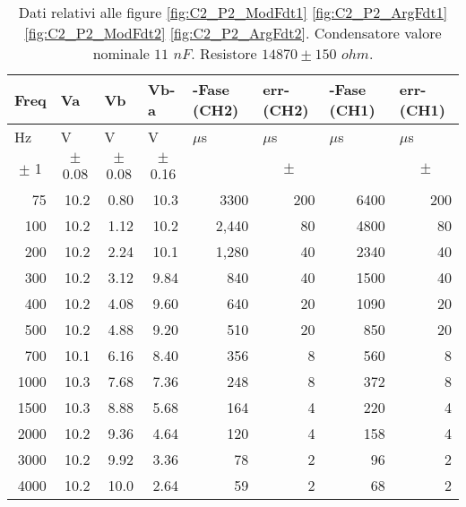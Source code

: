 \begin{table}[H]
\begin{center}
\begin{tabular}{|r|r|r|r|r|r|r|r|}
\hline
\multicolumn{1}{|l|}{Freq} & \multicolumn{1}{l|}{Va} & \multicolumn{1}{l|}{Vb} & \multicolumn{1}{l|}{Vb-a} & \multicolumn{1}{l|}{-Fase (CH2)} & \multicolumn{1}{l|}{err-(CH2)} & \multicolumn{1}{l|}{-Fase (CH1)} & \multicolumn{1}{l|}{err-(CH1)} \\ \hline
\multicolumn{1}{|l|}{Hz} & \multicolumn{1}{l|}{V} & \multicolumn{1}{l|}{V} & \multicolumn{1}{l|}{V} & \multicolumn{1}{l|}{$\mu$s} & \multicolumn{1}{l|}{$\mu$s} & \multicolumn{1}{l|}{$\mu$s} & \multicolumn{1}{l|}{$\mu$s} \\ \hline
\multicolumn{1}{|c|}{$\pm$ 1} & \multicolumn{1}{c|}{$\pm$ 0.08} & \multicolumn{1}{c|}{$\pm$ 0.08} & \multicolumn{1}{c|}{$\pm$ 0.16} & \multicolumn{1}{l|}{} & \multicolumn{1}{c|}{$\pm$ } & \multicolumn{1}{l|}{} & \multicolumn{1}{c|}{$\pm$ } \\ \hline
75 & 10.2 & 0.80 & 10.3 & 3300 & 200 & 6400 & 200 \\ \hline
100 & 10.2 & 1.12 & 10.2 & 2,440 & 80 & 4800 & 80 \\ \hline
200 & 10.2 & 2.24 & 10.1 & 1,280 & 40 & 2340 & 40 \\ \hline
300 & 10.2 & 3.12 & 9.84 & 840 & 40 & 1500 & 40 \\ \hline
400 & 10.2 & 4.08 & 9.60 & 640 & 20 & 1090 & 20 \\ \hline
500 & 10.2 & 4.88 & 9.20 & 510 & 20 & 850 & 20 \\ \hline
700 & 10.1 & 6.16 & 8.40 & 356 & 8 & 560 & 8 \\ \hline
1000 & 10.3 & 7.68 & 7.36 & 248 & 8 & 372 & 8 \\ \hline
1500 & 10.3 & 8.88 & 5.68 & 164 & 4 & 220 & 4 \\ \hline
2000 & 10.2 & 9.36 & 4.64 & 120 & 4 & 158 & 4 \\ \hline
3000 & 10.2 & 9.92 & 3.36 & 78 & 2 & 96 & 2 \\ \hline
4000 & 10.2 & 10.0 & 2.64 & 59 & 2 & 68 & 2 \\ \hline
\end{tabular}
\end{center}
\caption{
Dati relativi alle figure
\ref{fig:C2_P2_ModFdt1}
\ref{fig:C2_P2_ArgFdt1}
\ref{fig:C2_P2_ModFdt2}
\ref{fig:C2_P2_ArgFdt2}.
Condensatore valore nominale $11$ $nF$.
Resistore $14870\pm 150$ $ohm$.
}
\label{C2_P2_cond1}
\end{table}
